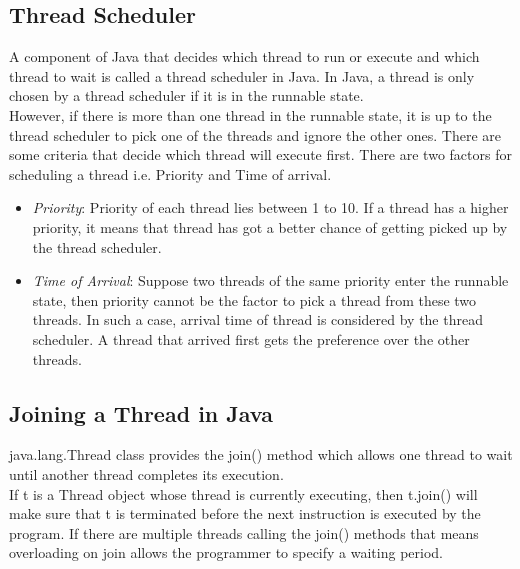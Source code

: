 \documentclass[11pt]{article}
\begin{document}
\subsection{Thread Scheduler}
A component of Java that decides which thread to run or execute and which thread to wait is called a thread scheduler in Java. In Java, a thread is only chosen by a thread scheduler if it is in the runnable state.\\

However, if there is more than one thread in the runnable state, it is up to the thread scheduler to pick one of the threads and ignore the other ones. There are some criteria that decide which thread will execute first. There are two factors for scheduling a thread i.e. Priority and Time of arrival.

\begin{itemize}
	\item \textit{Priority}: Priority of each thread lies between 1 to 10. If a thread has a higher priority, it means that thread has got a better chance of getting picked up by the thread scheduler.

	\item \textit{Time of Arrival}: Suppose two threads of the same priority enter the runnable state, then priority cannot be the factor to pick a thread from these two threads. In such a case, arrival time of thread is considered by the thread scheduler. A thread that arrived first gets the preference over the other threads.
\end{itemize}


\subsection{Joining a Thread in Java}
java.lang.Thread class provides the join() method which allows one thread to wait until another thread completes its execution.\\

If t is a Thread object whose thread is currently executing, then t.join() will make sure that t is terminated before the next instruction is executed by the program.
If there are multiple threads calling the join() methods that means overloading on join allows the programmer to specify a waiting period.\\
\end{document}
